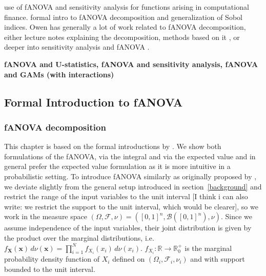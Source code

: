 \cite{liu2006} use of fANOVA and sensitivity analysis for functions arising in computational finance.
\cite{owen2013} formal intro to fANOVA decomposition and generalization of Sobol indices.
Owen has generally a lot of work related to fANOVA decomposition, either lecture notes explaining the decomposition, methods based on it \cite{owen2003}, or deeper into sensitivity analysis and fANOVA \cite{owen2013}.

\textbf{fANOVA and U-statistics, fANOVA and sensitivity analysis, fANOVA and GAMs (with interactions)}

\subsection{Formal Introduction to fANOVA}

\subsubsection*{fANOVA decomposition}
This chapter is based on the formal introductions by \cite{rahman2014, sobol1993sensitivity, sobol2001, hooker2004, owen2013, muehlenstaedt2012}. We show both formulations of the fANOVA, via the integral and via the expected value and in general prefer the expected value formulation as it is more intuitive in a probabilistic setting.
To introduce fANOVA similarly as originally proposed by \cite{sobol1993sensitivity}, we deviate slightly from the general setup introduced in section~\ref{background} and restrict the range of the input variables to the unit interval [I think i can also write: we restrict the support to the unit interval, which would be clearer], so we work in the measure space $(\Omega, \mathcal{F}, \nu) = ([0, 1]^n, \mathcal{B}([0, 1]^n), \nu)$.
Since we assume independence of the input variables, their joint distribution is given by the product over the marginal distributions, i.e. \(f_{\boldsymbol{X}}(\boldsymbol{x}) \, d\nu(\boldsymbol{x}) = \prod_{i=1}^{N} f_{X_i}(x_i) \, d\nu(x_i)\). \(f_{X_i}: \mathbb{R} \rightarrow \mathbb{R}_{0}^{+}\) is the marginal probability density function of \(X_i\) defined on $(\Omega_i, \mathcal{F}_i, \nu_i)$ and with support bounded to the unit interval.



